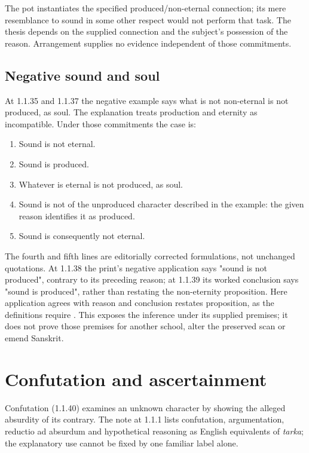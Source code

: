The pot instantiates the specified produced/non-eternal connection; its
mere resemblance to sound in some other respect would not perform that task.
The thesis depends on the supplied connection and the subject's possession
of the reason. Arrangement supplies no evidence independent of those commitments.

\subsection{Negative sound and soul}

At 1.1.35 and 1.1.37 the negative example says what is not non-eternal is
not produced, as soul. The explanation treats production and eternity as
incompatible. Under those commitments the case is:

\begin{enumerate}
 \item Sound is not eternal.
 \item Sound is produced.
 \item Whatever is eternal is not produced, as soul.
 \item Sound is not of the unproduced character described in the example:
 the given reason identifies it as produced.
 \item Sound is consequently not eternal.
\end{enumerate}

The fourth and fifth lines are editorially corrected formulations, not
unchanged quotations. At 1.1.38 the print's negative application says
"sound is not produced", contrary to its preceding reason; at 1.1.39 its
worked conclusion says "sound is produced", rather than restating the
non-eternity proposition. Here application agrees with reason and conclusion
restates proposition, as the definitions require
\cite[pp.~12--13]{GotamaVidyabhusana1913NyayaSutras}.
This exposes the inference under its supplied premises; it does not prove
those premises for another school, alter the preserved scan or emend Sanskrit.

\section{Confutation and ascertainment}
\label{sec:p13-nyaya-tarka-ascertainment}

Confutation (1.1.40) examines an unknown character by showing the alleged
absurdity of its contrary. The note at 1.1.1 lists confutation, argumentation,
reductio ad absurdum and hypothetical reasoning as English equivalents of
\emph{tarka}; the explanatory use cannot be fixed by one familiar label alone.

